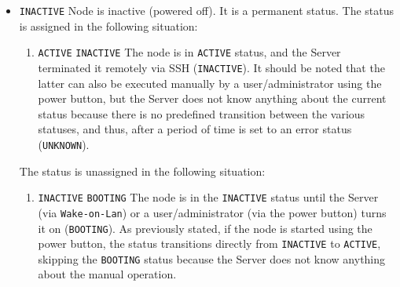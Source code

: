 \begin{itemize}
\begin{itemize}
      \item \texttt{INACTIVE}
        \newline
        Node is inactive (powered off).
        \newline
        It is a permanent status.
        \newline
        The status is assigned in the following situation:
        \begin{enumerate}
          \item \texttt{ACTIVE}  \texttt{INACTIVE}
            \newline
            The node is in \texttt{ACTIVE} status, and the Server terminated it
            remotely via SSH (\texttt{INACTIVE}).
            \newline
            It should be noted that the latter can also be executed manually by
            a user/administrator using the power button, but the Server does not
            know anything about the current status because there is no predefined
            transition between the various statuses, and thus, after a period of
            time is set to an error status (\texttt{UNKNOWN}).
        \end{enumerate}
        The status is unassigned in the following situation:
        \begin{enumerate}
          \item \texttt{INACTIVE}  \texttt{BOOTING}
            \newline
            The node is in the \texttt{INACTIVE} status until the Server (via
            \texttt{Wake-on-Lan}) or a user/administrator (via the power button)
            turns it on (\texttt{BOOTING}).
            \newline
            As previously stated, if the node is started using the power button,
            the status transitions directly from \texttt{INACTIVE} to \texttt{ACTIVE},
            skipping the \texttt{BOOTING} status because the Server does not
            know anything about the manual operation.
        \end{enumerate}


\end{itemize}
\end{itemize}
